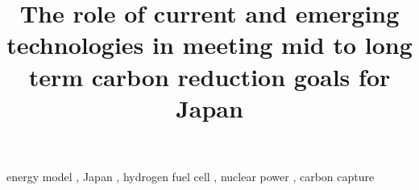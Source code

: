 \documentclass[review]{elsarticle}
\begin{document}
\begin{frontmatter}
\title{The role of current and emerging technologies in meeting mid to long term carbon reduction goals for Japan}

\date{}                     %




	
\begin{keyword}
energy model \sep
Japan \sep
hydrogen fuel cell \sep
nuclear power \sep
carbon capture
\end{keyword}



\end{frontmatter}
\glsresetall

\linenumbers



\FloatBarrier

\FloatBarrier

\FloatBarrier

\FloatBarrier

\FloatBarrier

\FloatBarrier

\FloatBarrier


\newpage
\appendix

\end{document}
